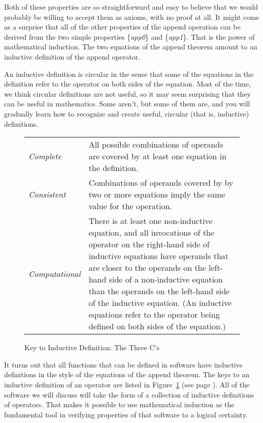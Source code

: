 Both of these properties are so straightforward and easy to believe that we would probably be willing to accept them as axioms, with no proof at all. It might come as a surprise that all of the other properties of the append operation can be derived from the two simple properties \{\emph{app0}\} and \{\emph{app1}\}. That is the power of mathematical induction. The two equations of the append theorem amount to an inductive definition of the append operator.

An inductive definition is circular in the sense that some of the equations in the definition refer to the operator on both sides of the equation. Most of the time, we think circular definitions are not useful, so it may seem surprising that they can be useful in mathematics. Some aren't, but some of them are, and you will gradually learn how to recognize and create useful, circular (that is, inductive) definitions.

\begin{figure}
\begin{center}
\begin{tabular}{lp{3.5in}}
\emph{Complete} & All possible combinations of operands are covered by at least one equation in the definition. \\
\emph{Consistent} & Combinations of operands covered by by two or more equations imply the same value for the operation. \\
\emph{Computational} & There is at least one non-inductive equation, and all invocations of the operator on the right-hand side of inductive equations have operands that are closer to the operands on the left-hand side of a non-inductive equation than the operands on the left-hand side of the inductive equation. (An inductive equations refer to the operator being defined on both sides of the equation.)
\end{tabular}
\caption{Key to Inductive Definition: The Three C's}
\end{center}
\label{fig:inductive-def-keys}
\end{figure}

It turns out that all functions that can be defined in software have inductive definitions in the style of the equations of the append theorem. The keys to an inductive definition of an operator are listed in Figure~\ref{fig:inductive-def-keys}
(see page \pageref{fig:inductive-def-keys}). All of the software we will discuss will take the form of a collection of inductive definitions of operators. That makes it possible to use mathematical induction as the fundamental tool in verifying properties of that software to a logical certainty.

